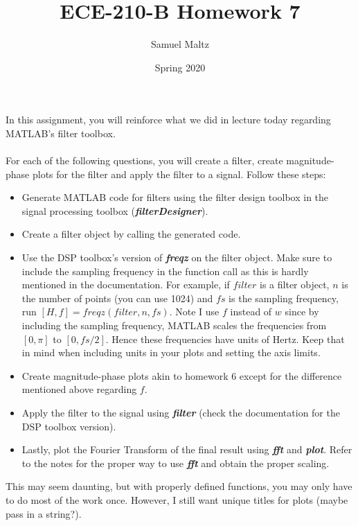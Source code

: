 \documentclass[12pt]{article}
\title{ECE-210-B Homework 7}
\author{Samuel Maltz}
\date{Spring 2020}
\begin{document}
\noindent In this assignment, you will reinforce what we did in lecture today regarding MATLAB’s filter toolbox.
\\ \\
For each of the following questions, you will create a filter, create magnitude-phase plots for the filter and apply the filter to a signal. Follow these steps:
\begin{itemize}
\item Generate MATLAB code for filters using the filter design toolbox in the signal processing toolbox (\textbf{\textit{filterDesigner}}).
\item Create a filter object by calling the generated code.
\item Use the DSP toolbox's version of \textbf{\textit{freqz}} on the filter object. Make sure to include the sampling frequency in the function call as this is hardly mentioned in the documentation. For example, if $filter$ is a filter object, $n$ is the number of points (you can use 1024) and $fs$ is the sampling frequency, run $[H,f] = freqz(filter,n,fs)$. Note I use $f$ instead of $w$ since by including the sampling frequency, MATLAB scales the frequencies from $[0,\pi]$ to $[0,fs/2]$. Hence these frequencies have units of Hertz. Keep that in mind when including units in your plots and setting the axis limits.
\item Create magnitude-phase plots akin to homework 6 except for the difference mentioned above regarding $f$.
\item Apply the filter to the signal using \textbf{\textit{filter}} (check the documentation for the DSP toolbox version).
\item Lastly, plot the Fourier Transform of the final result using \textbf{\textit{fft}} and \textbf{\textit{plot}}. Refer to the notes for the proper way to use \textbf{\textit{fft}} and obtain the proper scaling.
\end{itemize}

\noindent This may seem daunting, but with properly defined functions, you may only have to do most of the work once. However, I still want unique titles for plots (maybe pass in a string?).
\end{document}
